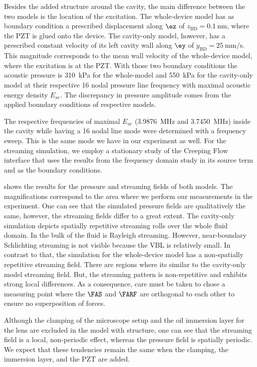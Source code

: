 Besides the added structure around the cavity, the main difference between the 
two models is the location of the excitation. The whole-device model has as 
boundary condition a prescribed displacement along $\ez$ of 
$z_{\text{BD}}=\SI{0.1}{\nm}$, where the PZT is glued onto the device. The 
cavity-only model, however, has a prescribed constant velocity of its left 
cavity wall along $\ey$ of $\dot{y}_{\text{BD}} = \SI{25}{\mm\per\second}$. 
This magnitude corresponds to the mean wall velocity of the whole-device model, 
where the excitation is at the PZT. With those two boundary conditions the 
acoustic pressure is \SI{310}{\kPa} for the whole-model and \SI{550}{\kPa} for 
the cavity-only model at their respective 16 nodal pressure line frequency with 
maximal acoustic energy density $E_{\text{ac}}$. The discrepancy in pressure 
amplitude comes from the applied boundary conditions of respective models.

The respective frequencies of maximal $E_{\text{ac}}$ 
(\SI{3.9876}{\MHz} and \SI{3.7450}{\MHz}) inside the cavity while having a 16 
nodal line mode were determined with a frequency sweep. This is the same mode 
we have in our experiment as well. For the streaming simulation, we employ a 
stationary study of the Creeping Flow interface that uses the results from the 
frequency domain study in its source term and as the boundary conditions.

 shows the results for the pressure and streaming 
fields of both models. The magnifications correspond to the area where we 
perform our measurements in the experiment. One can see that the simulated 
pressure fields are qualitatively the same, however, the streaming fields 
differ to a great extent. The cavity-only simulation depicts spatially 
repetitive streaming rolls over the whole fluid domain. In the bulk of the 
fluid is Rayleigh streaming. However, near-boundary Schlichting streaming is 
not visible because the VBL is relatively small. In contrast 
to that, the simulation for the whole-device model has a non-spatially 
repetitive streaming field. There are regions where its similar to the 
cavity-only model streaming field. But, the streaming pattern is non-repetitive 
and exhibits strong local differences. As a consequence, care must be taken to 
chose a measuring point where the $\FAS$ and $\FARF$ are orthogonal to each 
other to ensure no superposition of forces.

Although the clamping of the microscope setup and the oil immersion layer for 
the lens are excluded in the model with structure, one can see that the 
streaming field is a local, non-periodic effect, whereas the pressure field is 
spatially periodic. We expect that these tendencies remain the same when the 
clamping, the immersion layer, and the PZT are added.

